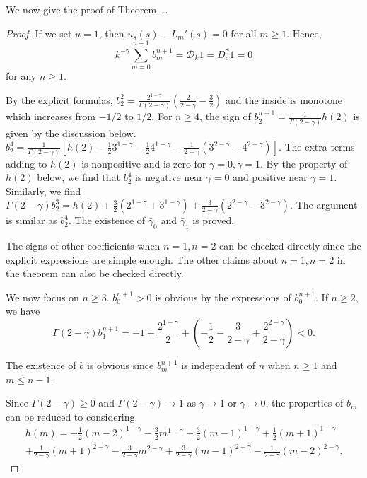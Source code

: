 \documentclass[11pt]{article} %
\begin{document}
We now give the proof of Theorem ...
\begin{proof}
If we set $u=1$, then $u_s(s)-L_m'(s)=0$ for all $m\ge 1$. Hence, $$
k^{-\gamma}\sum_{m=0}^{n+1}b_m^{n+1}=\mathcal{D}_k1=D_c^{\gamma}1=0
$$
for any $n\ge 1$.

By the explicit formulas, $b_2^2=\frac{2^{1-\gamma}}{\Gamma(2-\gamma)}(\frac{2}{2-\gamma}-\frac{3}{2})$ and the inside is monotone which increases from $-1/2$ to $1/2$. For $n\ge 4$, the sign of $b_2^{n+1}=\frac{1}{\Gamma(2-\gamma)}h(2)$ is given by the discussion below. $b_2^4=\frac{1}{\Gamma(2-\gamma)}[h(2)-\frac{1}{2}3^{1-\gamma}-\frac{1}{2}4^{1-\gamma}-\frac{1}{2-\gamma}(3^{2-\gamma}-4^{2-\gamma})]$. The extra terms adding to $h(2)$ is nonpositive and is zero for $\gamma=0, \gamma=1$. By the property of $h(2)$ below, we find that $b_2^{4}$ is negative near $\gamma=0$ and positive near $\gamma=1$. Similarly, we find $\Gamma(2-\gamma)b_2^3=h(2)+\frac{3}{2}(2^{1-\gamma}+3^{1-\gamma})+\frac{3}{2-\gamma}(2^{2-\gamma}-3^{2-\gamma})$. The argument is similar as $b_2^4$.
The existence of $\bar{\gamma}_0$ and $\bar{\gamma}_1$ is proved.

The signs of other coefficients when $n=1, n=2$ can be checked directly since the explicit expressions are simple enough. The other claims about $n=1, n=2$ in the theorem can also be checked directly.

We now focus on $n\ge 3$. $b_0^{n+1}>0$ is obvious by the expressions of $b_0^{n+1}$. If $n\ge 2$, we have $$
\Gamma(2-\gamma)b_1^{n+1}=-1+\frac{2^{1-\gamma}}{2}+(-\frac{1}{2}-\frac{3}{2-\gamma}+\frac{2^{2-\gamma}}{2-\gamma})< 0.
$$

The existence of $b$ is obvious since $b_m^{n+1}$ is independent of $n$ when $n\ge 1$ and $m\le n-1$.

Since $\Gamma(2-\gamma)\ge 0$ and $\Gamma(2-\gamma)\to 1$ as $\gamma\to 1$ or $\gamma\to 0$, the properties of $b_m$ can be reduced to considering
\begin{multline*}
h(m)=-\frac{1}{2}(m-2)^{1-\gamma}-\frac{3}{2}m^{1-\gamma}+\frac{3}{2}(m-1)^{1-\gamma}+\frac{1}{2}(m+1)^{1-\gamma}\\
+\frac{1}{2-\gamma}(m+1)^{2-\gamma}
-\frac{3}{2-\gamma}m^{2-\gamma}
+\frac{3}{2-\gamma}(m-1)^{2-\gamma}
-\frac{1}{2-\gamma}(m-2)^{2-\gamma}.
\end{multline*}



\end{proof}
\end{document}
